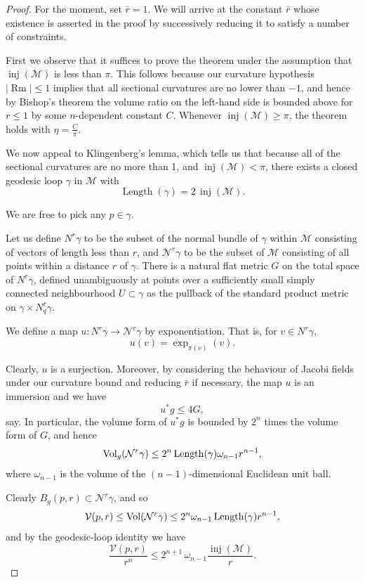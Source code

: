\begin{proof}
For the moment, set $\bar r = 1$. We will arrive at the constant $\bar r$
whose existence is asserted in the proof by successively reducing it to satisfy
a number of constraints.

First we observe that it suffices to prove the theorem under the assumption
that $\operatorname{inj}(\mathcal M)$ is less than $\pi$. This follows because
our curvature hypothesis $|\operatorname{Rm}| \le 1$ implies that all
sectional curvatures are no lower than $-1$, and hence by Bishop's theorem the
volume ratio on the left-hand side is bounded above for $r \le 1$ by some
$n$-dependent constant $C$. Whenever $\operatorname{inj}(\mathcal M)\ge \pi$,
the theorem holds with $\eta = \frac{C}{\pi}$.

We now appeal to Klingenberg's lemma, which tells us that because all of the
sectional curvatures are no more than 1, and $\operatorname{inj}(\mathcal M)<\pi$,
there exists a closed geodesic loop $\gamma$ in $\mathcal M$ with
\[
\operatorname{Length}(\gamma) = 2\,\operatorname{inj}(\mathcal M).
\]

We are free to pick any $p \in \gamma$.

Let us define $N^r\gamma$ to be the subset of the normal bundle of $\gamma$
within $\mathcal M$ consisting of vectors of length less than $r$, and
$\mathcal N^r\gamma$ to be the subset of $\mathcal M$ consisting of all points
within a distance $r$ of $\gamma$. There is a natural flat metric $G$ on the
total space of $N^r\gamma$, defined unambiguously at points over a sufficiently
small simply connected neighbourhood $U\subset \gamma$ as the pullback of the
standard product metric on $\gamma \times N_q^r\gamma$.

We define a map $u : N^r\gamma \to \mathcal N^r\gamma$ by exponentiation. That
is, for $v \in N^r\gamma$,
\[
u(v) = \exp_{\pi(v)}(v).
\]

Clearly, $u$ is a surjection. Moreover, by considering the behaviour of Jacobi
fields under our curvature bound and reducing $\bar r$ if necessary, the map
$u$ is an immersion and we have
\[
u^*g \le 4G,
\]
say. In particular, the volume form of $u^*g$ is bounded by $2^n$ times the
volume form of $G$, and hence
\[
\operatorname{Vol}_g(\mathcal N^r\gamma) \le 2^n \operatorname{Length}(\gamma)\omega_{n-1}r^{n-1},
\]
where $\omega_{n-1}$ is the volume of the $(n-1)$-dimensional Euclidean unit
ball.

Clearly $B_g(p,r) \subset \mathcal N^r\gamma$, and so
\[
\mathcal V(p,r) \le \operatorname{Vol}(\mathcal N^r\gamma) \le 2^n \omega_{n-1}\operatorname{Length}(\gamma)r^{n-1},
\]
and by the geodesic-loop identity we have
\[
\frac{\mathcal V(p,r)}{r^n} \le 2^{n+1}\,\omega_{n-1}\frac{\operatorname{inj}(\mathcal M)}{r}.
\]
\end{proof}

